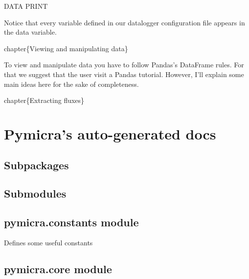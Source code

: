 \documentclass[a4paper,10pt,english]{sphinxmanual}
\begin{document}
DATA PRINT

Notice that every variable defined in our datalogger configuration file appears in the
data variable.

chapter\{Viewing and manipulating data\}

To view and manipulate data you have to follow Pandas's DataFrame rules. For
that we suggest that the user visit a Pandas tutorial. However, I'll explain
some main ideas here for the sake of completeness.

chapter\{Extracting fluxes\}


\section{Pymicra's auto-generated docs}
\label{pymicra:pymicra-s-auto-generated-docs}\label{pymicra::doc}

\subsection{Subpackages}
\label{pymicra:subpackages}

\subsection{Submodules}
\label{pymicra:submodules}

\subsection{pymicra.constants module}
\label{pymicra:module-pymicra.constants}\label{pymicra:pymicra-constants-module}
Defines some useful constants


\subsection{pymicra.core module}
\label{pymicra:module-pymicra.core}\label{pymicra:pymicra-core-module}
\end{document}
